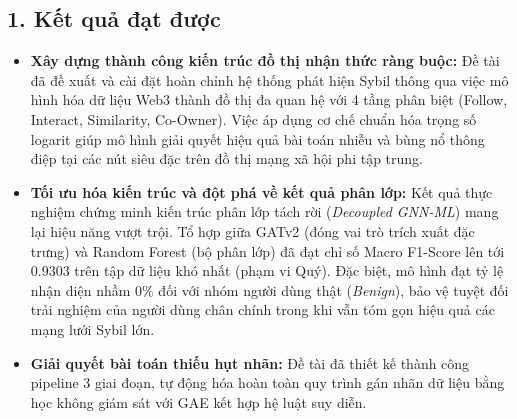 \subsection{1. Kết quả đạt được}

\begin{itemize}[label={--}, itemsep=1pt]
    \item \textbf{Xây dựng thành công kiến trúc đồ thị nhận thức ràng buộc:} Đề tài đã đề xuất và cài đặt hoàn chỉnh hệ thống phát hiện Sybil thông qua việc mô hình hóa dữ liệu Web3 thành đồ thị đa quan hệ với 4 tầng phân biệt (Follow, Interact, Similarity, Co-Owner). Việc áp dụng cơ chế chuẩn hóa trọng số logarit giúp mô hình giải quyết hiệu quả bài toán nhiễu và bùng nổ thông điệp tại các nút siêu đặc trên đồ thị mạng xã hội phi tập trung.
    
    \item \textbf{Tối ưu hóa kiến trúc và đột phá về kết quả phân lớp:} Kết quả thực nghiệm chứng minh kiến trúc phân lớp tách rời (\textit{Decoupled GNN-ML}) mang lại hiệu năng vượt trội. Tổ hợp giữa GATv2 (đóng vai trò trích xuất đặc trưng) và Random Forest (bộ phân lớp) đã đạt chỉ số Macro F1-Score lên tới 0.9303 trên tập dữ liệu khó nhất (phạm vi Quý). Đặc biệt, mô hình đạt tỷ lệ nhận diện nhầm 0\% đối với nhóm người dùng thật (\textit{Benign}), bảo vệ tuyệt đối trải nghiệm của người dùng chân chính trong khi vẫn tóm gọn hiệu quả các mạng lưới Sybil lớn.
    
    \item \textbf{Giải quyết bài toán thiếu hụt nhãn:} Đề tài đã thiết kế thành công pipeline 3 giai đoạn, tự động hóa hoàn toàn quy trình gán nhãn dữ liệu bằng học không giám sát với GAE kết hợp hệ luật suy diễn.
\end{itemize}